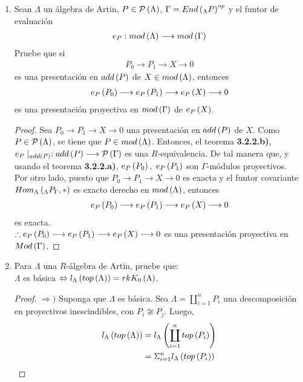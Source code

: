 \documentclass{article}
\begin{document}
\begin{enumerate}[label=\textbf{Ej \arabic*.}]
		\item Sean $\Lambda$ un álgebra de Artin, $P\in\mathcal{P}\left(\Lambda\right)$, $\Gamma = {End\left(_{\Lambda}P\right)}^{op}$ y el funtor de evaluación
		\begin{align*}
			e_{P}:mod\left(\Lambda\right)\longrightarrow mod\left(\Gamma\right)
		\end{align*}
		Pruebe que si
		\begin{align*}
			P_{0} \longrightarrow P_{1} \longrightarrow X \longrightarrow 0
		\end{align*}
		es una presentación en $add\left(P\right)$ de $X \in mod\left(\Lambda\right)$, entonces 
		\begin{align*}
			e_{P}\left(P_{0}\right) \longrightarrow e_{P}\left(P_{1}\right) \longrightarrow e_{P}\left(X\right) \longrightarrow 0
		\end{align*}
		es una presentación proyectiva en $mod\left(\Gamma\right)$ de $e_{P}\left(X\right)$.
		\begin{proof}
			Sea	$P_{0} \longrightarrow P_{1} \longrightarrow X \longrightarrow 0$ una presentación en $add\left(P\right)$ de $X$. Como $P\in\mathcal{P}\left(\Lambda\right)$,  se tiene que $P \in mod\left(\Lambda\right)$. Entonces, el teorema \textbf{3.2.2.b)}, $e_{P}\mid_{add\left(P\right)}:add\left(P\right)\longrightarrow\mathcal{P}\left(\Gamma\right)$ es una $R$-equivalencia. De tal manera que, y usando el teorema \textbf{3.2.2.a)}, $e_{P}\left(P_{0}\right),\ e_{P}\left(P_{1}\right)$ son $\Gamma$-módulos proyectivos.\\
		
			Por otro lado, puesto que $P_{0} \longrightarrow P_{1} \longrightarrow X \longrightarrow 0$ es exacta y el funtor covariante $\ringmodhom{\Lambda}{\ringbimod{\Lambda}{\Gamma}{P}{lr}}{*}$ es exacto derecho en $mod\left(\Lambda\right)$, entonces
			\begin{align*}
				e_{P}\left(P_{0}\right) \longrightarrow e_{P}\left(P_{1}\right) \longrightarrow e_{P}\left(X\right) \longrightarrow 0
			\end{align*}
			es exacta.\\
			$\therefore e_{P}\left(P_{0}\right) \longrightarrow e_{P}\left(P_{1}\right) \longrightarrow e_{P}\left(X\right) \longrightarrow 0$ es una presentación proyectiva en $Mod\left(\Gamma\right)$.
		\end{proof}
		
		\item Para $\Lambda$ una $R$-álgebra de Artin, pruebe que:\\
		$\Lambda$ es básica $\Leftrightarrow l_{\Lambda}\left(top\left(\Lambda\right)\right)=rkK_{0}\left(\Lambda\right)$.
		\begin{proof}
			$\boxed{\Rightarrow )}$ Suponga que $\Lambda$ es básica. Sea $\Lambda=\displaystyle\coprod_{i=1}^{n}P_{i}$ una descomposición en proyectivos inescindibles, con $P_{i} \not\cong P_{j}$. Luego,
			\begin{align*}
				l_{\Lambda}\left(top\left(\Lambda\right)\right)&=l_{\Lambda}\left(\displaystyle\coprod_{i=1}^{n}top\left(P_{i}\right)\right)\\
				&=\displaystyle\Sigma_{i=1}^{n}l_{\Lambda}\left(top\left(P_{i}\right)\right)
			\end{align*}
		

\end{proof}
\end{enumerate}
\end{document}
